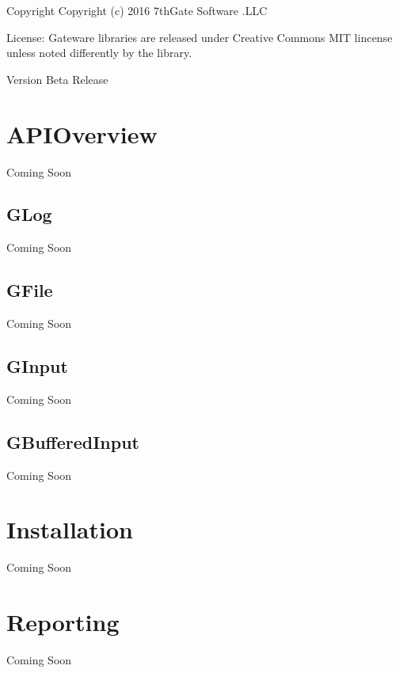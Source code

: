 \begin{DoxyCopyright}{Copyright}
Copyright (c) 2016 7th\+Gate Software .L\+LC 
\end{DoxyCopyright}
\begin{DoxyParagraph}{License\+:}
Gateware libraries are released under Creative Commons M\+IT lincense unless noted differently by the library. 
\end{DoxyParagraph}
\begin{DoxyVersion}{Version}
Beta Release
\end{DoxyVersion}
\hypertarget{index_API}{}\section{A\+P\+I\+Overview}\label{index_API}
Coming Soon\hypertarget{index_APIOverview}{}\subsection{G\+Log}\label{index_APIOverview}
Coming Soon\hypertarget{index_GLog}{}\subsection{G\+File}\label{index_GLog}
Coming Soon\hypertarget{index_GFile}{}\subsection{G\+Input}\label{index_GFile}
Coming Soon\hypertarget{index_GInput}{}\subsection{G\+Buffered\+Input}\label{index_GInput}
Coming Soon\hypertarget{index_Installation}{}\section{Installation}\label{index_Installation}
Coming Soon\hypertarget{index_Bug}{}\section{Reporting}\label{index_Bug}
Coming Soon 